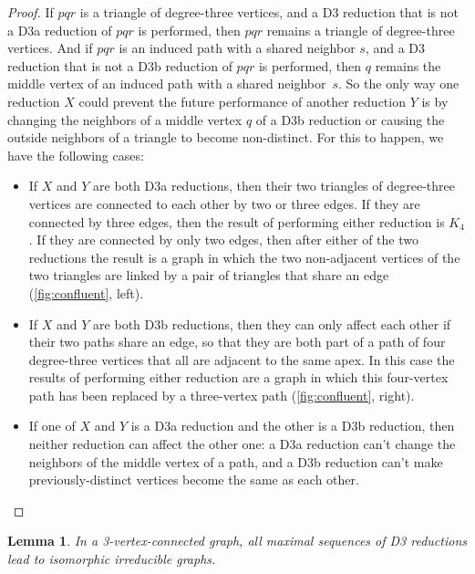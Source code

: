 \documentclass{article}
\newtheorem{lemma}{Lemma}
\begin{document}
\begin{proof}
If $pqr$ is a triangle of degree-three vertices, and a D3 reduction that is not a D3a reduction of $pqr$ is performed, then $pqr$ remains a triangle of degree-three vertices.
And if $pqr$ is an induced path with a shared neighbor $s$, and a D3 reduction that is not a D3b reduction of $pqr$ is performed, then $q$ remains the middle vertex of an induced path with a shared neighbor~$s$. So the only way one reduction $X$ could prevent the future performance of another reduction $Y$ is by changing the neighbors of a middle vertex $q$ of a D3b reduction or causing the outside neighbors of a triangle to become non-distinct.
For this to happen, we have the following cases:
\begin{itemize}
\item If $X$ and $Y$ are both D3a reductions, then their two triangles of degree-three vertices are connected to each other by two or three edges. If they are connected by three edges, then the result of performing either reduction is $K_4$. If they are connected by only two edges, then after either of the two reductions the result is a graph in which the two non-adjacent vertices of the two triangles are linked by a pair of triangles that share an edge (\autoref{fig:confluent}, left).
\item If $X$ and $Y$ are both D3b reductions, then they can only affect each other if their two paths share an edge, so that they are both part of a path of four degree-three vertices that all are adjacent to the same apex. In this case the results of performing either reduction are a graph in which this four-vertex path has been replaced by a three-vertex path (\autoref{fig:confluent}, right).
\item If one of $X$ and $Y$ is a D3a reduction and the other is a D3b reduction, then neither reduction can affect the other one: a D3a reduction can't change the neighbors of the middle vertex of a path, and a D3b reduction can't make previously-distinct vertices become the same as each other.\qedhere
\end{itemize}
\end{proof}

\begin{lemma}
\label{lem:confluence}
In a 3-vertex-connected graph, all maximal sequences of D3 reductions lead to isomorphic irreducible graphs.
\end{lemma}
\end{document}
